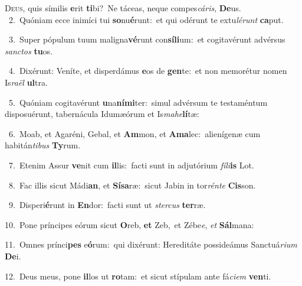 \lettrine{\initial\textcolor{\initialcolor}{D}}{eus,} quis símilis \textbf{e}\-rit \textbf{ti}\-bi?~\star Ne táceas, neque compes\-\textit{cá}\-\textit{ris}, \textbf{De}\-us.\\
{\numbfont\textcolor{\numbcolor}{~2.}}~Quóniam ecce inimíci tui \textbf{so}\-nu\-\textbf{é}\-runt:~\star et qui odérunt te extu\-\textit{lé}\-\textit{runt} \textbf{ca}\-put.\par
{\numbfont\textcolor{\numbcolor}{~3.}}~Super pópulum tuum maligna\-\textbf{vé}\-runt con\-\textbf{sí}\-\textbf{li}um:~\star et cogitavérunt advérsus \textit{sanc}\-\textit{tos} \textbf{tu}\-os.\par
{\numbfont\textcolor{\numbcolor}{~4.}}~Dixérunt: Veníte, et disperdámus \textbf{e}\-os de \textbf{gen}\-te:~\star et non memorétur nomen Is\-\textit{ra}\-\textit{ël} \textbf{ul}\-tra.\par
{\numbfont\textcolor{\numbcolor}{~5.}}~Quóniam cogitavérunt \textbf{u}\-na\-\textbf{ní}\-\textbf{mi}ter:~\star simul advérsum te testaméntum disposuérunt, tabernácula Idumæórum et Is\-\textit{ma}\-\textit{he}\textbf{lí}tæ:\par
{\numbfont\textcolor{\numbcolor}{~6.}}~Moab, et Agaréni, Gebal, et \textbf{Am}\-mon, et \textbf{A}\-\textbf{ma}lec:~\star alienígenæ cum habitán\-\textit{ti}\-\textit{bus} \textbf{Ty}\-rum.\par
{\numbfont\textcolor{\numbcolor}{~7.}}~Etenim Assur \textbf{ve}\-nit cum \textbf{il}\-lis:~\star facti sunt in adjutórium \textit{fí}\-\textit{li}\textbf{is} Lot.\par
{\numbfont\textcolor{\numbcolor}{~8.}}~Fac illis sicut Mádi\-\textbf{an}\-, et \textbf{Sí}\-\textbf{sa}ræ:~\star sicut Jabin in tor\-\textit{rén}\-\textit{te} \textbf{Cis}\-son.\par
{\numbfont\textcolor{\numbcolor}{~9.}}~Disperi\-\textbf{é}\-runt in \textbf{En}\-dor:~\star facti sunt ut \textit{ster}\-\textit{cus} \textbf{ter}\-ræ.\par
{\numbfont\textcolor{\numbcolor}{10.}}~Pone príncipes eórum sicut \textbf{O}\-reb, \textbf{et} Zeb,~\star et Zébe\-\textit{e}\-, \textit{et} \textbf{Sál}\-mana:\par
{\numbfont\textcolor{\numbcolor}{11.}}~Omnes prínci\textbf{pes} e\-\textbf{ó}\-rum:~\star qui dixérunt: Hereditáte possideámus Sanctuá\-\textit{ri}\-\textit{um} \textbf{De}\-i.\par
{\numbfont\textcolor{\numbcolor}{12.}}~Deus meus, pone \textbf{il}\-los ut \textbf{ro}\-tam:~\star et sicut stípulam ante fá\-\textit{ci}\-\textit{em} \textbf{ven}\-ti.\par
